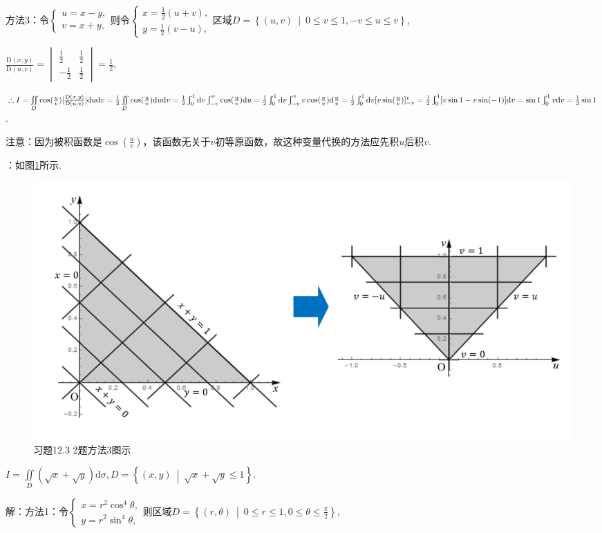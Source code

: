 \documentclass[12pt,UTF8]{ctexart}
\newcommand\Set[2]{\left\{#1\ \middle\vert\ #2 \right\}}
\newcommand{\Int}[4]{\varint\nolimits_{#1}^{#2}#3\mathrm d#4}
\newcommand{\IInt}[3]{\iint\limits_{#1}#2\mathrm d#3}
\newcommand{\varIInt}[4]{\iint\limits_{#1}#2\mathrm d#3\mathrm d#4}
\begin{document}
\begin{enumerate}
方法3：令$\begin{cases}
u=x-y,\\
v=x+y,
\end{cases}$则令$\begin{cases}
x=\frac12(u+v),\\
y=\frac12(v-u),
\end{cases}$区域$D=\Set{(u,v)}{0\leqslant v\leqslant1,-v\leqslant u\leqslant v}$,

$\frac{\mathrm D(x,y)}{\mathrm D(u,v)}=\begin{vmatrix}
\frac12&\frac12\\
-\frac12&\frac12
\end{vmatrix}=\frac12$,

$\therefore I=\varIInt D{\cos(\frac uv)|\frac{\mathrm D(x,y)}{\mathrm D(u,v)}|}uv=\frac12\varIInt D{\cos(\frac uv)}uv=\frac12\Int01{}v\Int{-v}v{\cos(\frac uv)}u=\frac12\Int01{}v\Int{-v}v{v\cos(\frac uv)}{\frac uv}\\
=\frac12\Int01{}v[v\sin(\frac uv)]_{-v}^v=\frac12\Int01{[v\sin1-v\sin(-1)]}v=\sin1\Int01vv=\frac12\sin1$.

注意：因为被积函数是$\cos(\frac uv)$，该函数无关于$v$初等原函数，故这种变量代换的方法应先积$u$后积$v$.

{}：如图\ref{12-3-2-3}所示.\footnotemark{}
\begin{figure}[H]
\begin{center}
\includegraphics[height=0.3\textheight]{Figures/Fig12-3-2-3.pdf}
\end{center}
\caption{习题12.3 2题方法3图示}
\label{12-3-2-3}
\end{figure}

$I=\IInt D{(\sqrt x+\sqrt y)}\sigma,D=\Set{(x,y)}{\sqrt x+\sqrt y\leqslant1}$.

解：方法1：令$\begin{cases}
x=r^2\cos^4\theta,\\
y=r^2\sin^4\theta,
\end{cases}$则区域$D=\Set{(r,\theta)}{0\leqslant r\leqslant1,0\leqslant\theta\leqslant\frac\pi2}$,


\end{enumerate}
\end{document}
